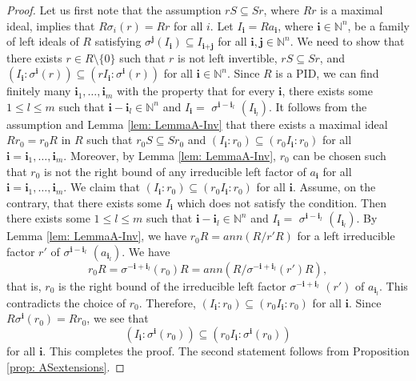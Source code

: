 \documentclass[10pt,a4paper]{amsart}
\newcommand{\s}{\sigma}
\begin{document}
		\begin{proof}
			Let us first note that  the assumption $rS\subseteq Sr$, where \(Rr\) is a maximal ideal, implies that \(R\s_i(r) = Rr\) for all \(i\). Let  $I_{\textbf{i}}=Ra_{\textbf{i}}$, where $\textbf{i}\in \mathbb{N}^n$, be a family of left ideals of $R$ satisfying  $\s^{\textbf{j}}(I_{\textbf{i}})\subseteq I_{\textbf{i}+\textbf{j}}$ for all $\textbf{i},\textbf{j}\in \mathbb{N}^n$. We need to show that  there exists $r\in R\setminus\{0\}$ such that  \(r\) is not left invertible, 
			$rS\subseteq Sr$, and 
			\((I_{\mathbf{i}}:\s^{\mathbf{i}}(r))\subseteq (rI_{\mathbf{i}}:\s^{\mathbf{i}}(r))\) for all $\mathbf{i}\in \mathbb{N}^n$. Since $R$ is a PID,  we can find finitely many $\textbf{i}_1,\dots,\textbf{i}_m$ with the property that 
			for every $\textbf{i}$, there exists some $1\leq l\leq m$ such that
			 $\textbf{i}- \textbf{i}_l\in\mathbb{N}^n$ and $I_{\textbf{i}}=$ $\s^{\textbf{i}-\textbf{i}_l}$ $(I_{\textbf{i}_l})$.
			It follows from the assumption and Lemma \ref{lem: LemmaA-Inv} that  there exists a  maximal ideal  $Rr_0=r_0R$ in \(R\) such that  
			$r_0S\subseteq Sr_0$ and \((I_{\textbf{i}}:r_0)\subseteq (r_0I_{\textbf{i}}:r_0)\) 	for all $\textbf{i}=\textbf{i}_1,\dots,\textbf{i}_m$. Moreover, by Lemma \ref{lem: LemmaA-Inv}, $r_0$ can be chosen such that $r_0$ is not the right bound of any irreducible left factor of $a_{\textbf{i}}$ for all $\textbf{i}=\textbf{i}_1,\dots,\textbf{i}_m$.  We claim that $(I_{\textbf{i}}:r_0) \subseteq (r_0I_{\textbf{i}}:r_0)$ for all $\textbf{i}$. Assume, on the contrary, that there exists some $I_{\textbf{i}}$ which does not satisfy the condition. Then  there exists some $1\leq l\leq m$ such that
		$\textbf{i}- \textbf{i}_l\in\mathbb{N}^n$ and $I_{\textbf{i}}=$ $\s^{\textbf{i}-\textbf{i}_l}$ $(I_{\textbf{i}_l})$.
		 By Lemma \ref{lem: LemmaA-Inv}, we have 
			$r_0R=ann(R/r'R)$ for a left irreducible factor $r'$ of $\s^{\textbf{i}-\textbf{i}_l}$ $(a_{\textbf{i}_l})$. We have
			\[
				r_0R=\s^{-\textbf{i}+\textbf{i}_l}(r_0)R=ann(R/ \s^{-\textbf{i}+\textbf{i}_l}(r')R),
			\]  
			that is, $r_0$ is the right bound of the irreducible left factor $\s^{-\textbf{i}+\textbf{i}_l}$ $(r')$ of $a_{\textbf{i}_l}$. This contradicts the choice of $r_0$. Therefore,  $(I_{\textbf{i}}:r_0) \subseteq (r_0I_{\textbf{i}}:r_0)$ for all $\textbf{i}$. 	Since \(R\s^{\textbf{i}}(r_0) = Rr_0\), we see that 
			$$(I_{\textbf{i}}:\s^{\textbf{i}}(r_0)) \subseteq (r_0I_{\textbf{i}}:\s^{\textbf{i}}(r_0))$$ 
			for all $\textbf{i}$. This completes the proof. The second statement follows from Proposition \ref{prop: ASextensions}. 
		\end{proof}
\end{document}
